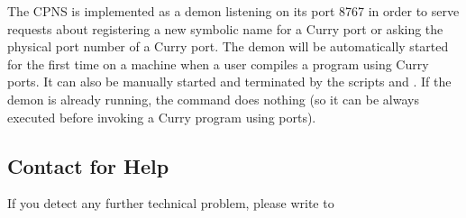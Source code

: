 The CPNS is implemented as a demon listening on its port 8767
in order to serve requests about registering a new symbolic
name for a Curry port or asking the physical port number
of a Curry port. The demon will be automatically started for
the first time on a machine when a user compiles a program
using Curry ports. It can also be manually started and terminated by the
scripts  and
.
If the demon is already running, the command
does nothing (so it can be always executed
before invoking a Curry program using ports).

\subsection{Contact for Help}

If you detect any further technical problem,
please write to
\begin{center}
\end{center}

